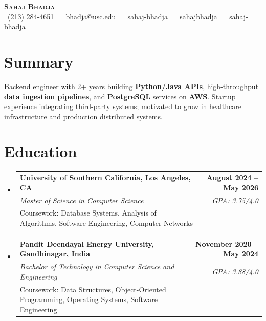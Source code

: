 \documentclass[letterpaper,10pt]{article}
\makeatletter
\newcommand{\resumeEduSubheading}[5]{\vspace{-1pt}\item\begin{tabular*}{1.0\textwidth}[t]{l@{\extracolsep{\fill}}r}\textbf{#1} & \textbf{\small #2} \\\textit{\small #3} & \textit{\small #4} \\\small #5 & \\\end{tabular*}\vspace{-4pt}}
\newcommand{\resumeSubHeadingListStart}{\begin{itemize}[leftmargin=0.0in, label={}]}
\newcommand{\resumeSubHeadingListEnd}{\end{itemize}}
\makeatother
\begin{document}
\begin{center}
{\Huge \scshape \textbf{Sahaj Bhadja}} \\ \vspace{1pt}
\small \href{tel:(213) 284-4651}{\faPhone\ \underline{(213) 284-4651}} ~ \href{mailto:bhadja@usc.edu}{\raisebox{-0.2\height}\faEnvelope\ \underline{bhadja@usc.edu}} ~
\href{https://www.linkedin.com/in/sahaj-bhadja/}{\raisebox{-0.2\height}\faLinkedin\ \underline{sahaj-bhadja}} ~ \href{https://github.com/SAHAJ-BHADJA}{\raisebox{-0.2\height}\faGithub\ \underline{sahajbhadja}} ~
\href{https://sahaj-bhadja.vercel.app/}{\raisebox{-0.2\height}\faGlobe\ \underline{sahaj-bhadja}}
\end{center}
\vspace{-18pt}
\section{Summary}
\begin{itemize}[leftmargin=0.15in, label={}]
\small{\item{Backend engineer with 2+ years building \textbf{Python/Java APIs}, high-throughput \textbf{data ingestion pipelines}, and \textbf{PostgreSQL} services on \textbf{AWS}. Startup experience integrating third-party systems; motivated to grow in healthcare infrastructure and production distributed systems.}}
\end{itemize}
\vspace{-16pt}
\section{Education}
\resumeSubHeadingListStart
\resumeEduSubheading{University of Southern California, Los Angeles, CA}{August 2024 -- May 2026}{Master of Science in Computer Science}{GPA: 3.75/4.0}{Coursework: Database Systems, Analysis of Algorithms, Software Engineering, Computer Networks}
\vspace{-9pt}
\resumeEduSubheading{Pandit Deendayal Energy University, Gandhinagar, India}{November 2020 -- May 2024}{Bachelor of Technology in Computer Science and Engineering}{GPA: 3.88/4.0}{Coursework: Data Structures, Object-Oriented Programming, Operating Systems, Software Engineering}
\resumeSubHeadingListEnd
\vspace{-14pt}
\end{document}
